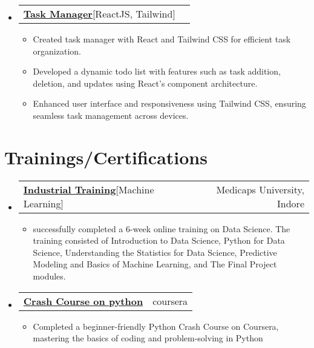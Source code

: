 \documentclass[letterpaper,11pt]{article}
\makeatletter
\newcommand{\resumeItem}[1]{
    \item\small{
      {#1 \vspace{-2pt}}
    }
  }
\newcommand{\resumeCertheading}[2]{
    \vspace{5pt}\item
      \begin{tabular*}{0.97\textwidth}[t]{l@{\extracolsep{\fill}}r}
        {#1} & #2 \\
      \end{tabular*}\vspace{-7pt}
  }
\newcommand{\resumeSubSubheading}[2]{
      \item
      \begin{tabular*}{0.97\textwidth}{l@{\extracolsep{\fill}}r}
        \textit{\small#1} & \textit{\small #2} \\
      \end{tabular*}\vspace{-7pt}
  }
\newcommand{\resumeProjectHeading}[2]{
      \item
      \begin{tabular*}{0.97\textwidth}{l@{\extracolsep{\fill}}r}
        \small#1 & #2 \\
      \end{tabular*}\vspace{-7pt}
  }
\newcommand{\resumeSubHeadingListStart}{\begin{itemize}[leftmargin=0.15in, label={}]}
\newcommand{\resumeSubHeadingListEnd}{\end{itemize}}
\newcommand{\resumeItemListStart}{\begin{itemize}}
\newcommand{\resumeItemListEnd}{\end{itemize}\vspace{-5pt}}
\makeatother
\begin{document}

\resumeSubHeadingListStart
\resumeProjectHeading
{\textbf{\href{https://github.com/shanutiwari1010/react-practice-projects/tree/main/03-todo}{Task Manager}\hspace{5pt}}{{[ReactJS, Tailwind]}}}{}
\resumeItemListStart
\resumeItem{Created task manager with React and Tailwind CSS for efficient task organization.
}
\resumeItem{Developed a dynamic todo list with features such as task addition, deletion, and updates using React's component architecture.}
\resumeItem{Enhanced user interface and responsiveness using Tailwind CSS, ensuring seamless task management across devices.}


\resumeItemListEnd
\resumeSubHeadingListEnd

\section{Trainings/Certifications}
\resumeSubHeadingListStart

\resumeCertheading
{\textbf{\href{https://medicaps.ac.in/}{Industrial Training}\hspace{5pt}}{{[Machine Learning]}}}{Medicaps University, Indore}
\resumeItemListStart
\resumeItem{successfully completed a 6-week online training on Data Science. The training 
consisted of Introduction to Data Science, Python for Data Science, Understanding the Statistics for Data 
Science, Predictive Modeling and Basics of Machine Learning, and The Final Project modules. }
\resumeItemListEnd

\resumeCertheading
{\textbf{\href{https://coursera.org/verify/FHDUZAK7YL3Q}{Crash Course on python}\hspace{3pt}}{{}}}{coursera}
\resumeItemListStart
\resumeItem{Completed a beginner-friendly Python Crash Course on Coursera, mastering the basics of coding and problem-solving in Python}
\resumeItemListEnd
\resumeSubHeadingListEnd
\end{document}
